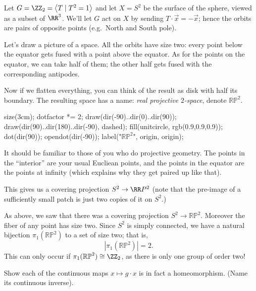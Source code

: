 \begin{example}[$\RR P^2$]
	Let $G = \Zc 2 = \left<T \mid T^2 = 1\right>$ and
	let $X = S^2$ be the surface of the sphere,
	viewed as a subset of $\RR^3$.
	We'll let $G$ act on $X$ by sending $T \cdot \vec x = - \vec x$;
	hence the orbits are pairs of opposite points (e.g.\ North and South pole).

	Let's draw a picture of a space.
	All the orbits have size two:
	every point below the equator gets fused with a point above the equator.
	As for the points on the equator, we can take half of them; the other half
	gets fused with the corresponding antipodes.

	Now if we flatten everything, you can think of the result as disk
	with half its boundary.
	The resulting space has a name: \emph{real projective $2$-space},
	denote $\mathbb{RP}^2$.
	\begin{center}
		\begin{asy}
			size(3cm);
			dotfactor *= 2;
			draw(dir(-90)..dir(0)..dir(90));
			draw(dir(90)..dir(180)..dir(-90), dashed);
			fill(unitcircle, rgb(0.9,0.9,0.9));
			dot(dir(90));
			opendot(dir(-90));
			label("$\mathbb{RP}^2$", origin, origin);
		\end{asy}
	\end{center}

	It should be familiar to those of you who do projective geometry.
	The points in the ``interior'' are your usual Eucliean points,
	and the points in the equator are the points at infinity
	(which explains why they get paired up like that).

	This gives us a covering projection $S^2 \to \RR P^2$
	(note that the pre-image of a sufficiently small patch is just two copies
	of it on $S^2$.)
\end{example}
\begin{example}
	As above, we saw that there was a covering projection
	$S^2 \to \mathbb{RP}^2$.
	Moreover the fiber of any point has size two.
	Since $S^2$ is simply connected, we have a natural bijection
	$\pi_1(\mathbb{RP}^2)$ to a set of size two; that is,
	\[ \left\lvert \pi_1(\mathbb{RP}^2) \right\rvert = 2. \]
	This can only occur if $\pi_1(\mathbb{RP}^2) \cong \Zc 2$,
	as there is only one group of order two!
\end{example}

\begin{ques}
	Show each of the continuous maps $x \mapsto g \cdot x$ is in fact a homeomorphism.
	(Name its continuous inverse).
\end{ques}


